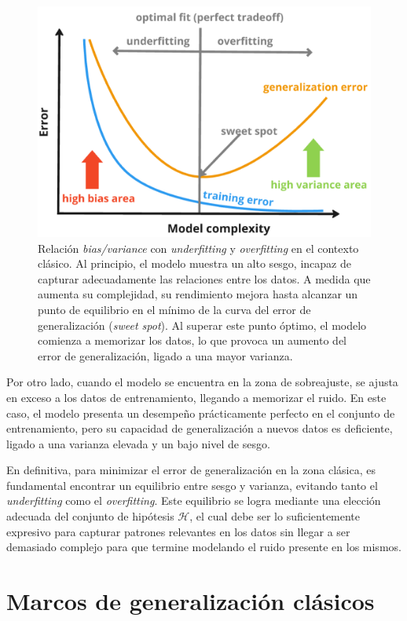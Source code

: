 \begin{figure}[h]
    \centering
    \includegraphics[width=0.6\linewidth]{img/biasvarianceunderoverfitting.png}
    \caption[Relación \textit{bias/variance} con \textit{underfitting} y \textit{overfitting} en el contexto clásico.] {Relación \textit{bias/variance} con \textit{underfitting} y \textit{overfitting} en el contexto clásico. Al principio, el modelo muestra un alto sesgo, incapaz de capturar adecuadamente las relaciones entre los datos. A medida que aumenta su complejidad, su rendimiento mejora hasta alcanzar un punto de equilibrio en el mínimo de la curva del error de generalización (\textit{sweet spot}). Al superar este punto óptimo, el modelo comienza a memorizar los datos, lo que provoca un aumento del error de generalización, ligado a una mayor varianza.}\label{fig:biasvarianceunderoverfitting}
\end{figure}

Por otro lado, cuando el modelo se encuentra en la zona de sobreajuste, se ajusta en exceso a los datos de entrenamiento, llegando a memorizar el ruido. En este caso, el modelo presenta un desempeño prácticamente perfecto en el conjunto de entrenamiento, pero su capacidad de generalización a nuevos datos es deficiente, ligado a una varianza elevada y un bajo nivel de sesgo.

En definitiva, para minimizar el error de generalización en la zona clásica, es fundamental encontrar un equilibrio entre sesgo y varianza, evitando tanto el \emph{underfitting} como el \emph{overfitting}. Este equilibrio se logra mediante una elección adecuada del conjunto de hipótesis $\mathcal{H}$, el cual debe ser lo suficientemente expresivo para capturar patrones relevantes en los datos sin llegar a ser demasiado complejo para que termine modelando el ruido presente en los mismos.

\section{Marcos de generalización clásicos}\label{sec:marcos-generalizacion-clasicos}

